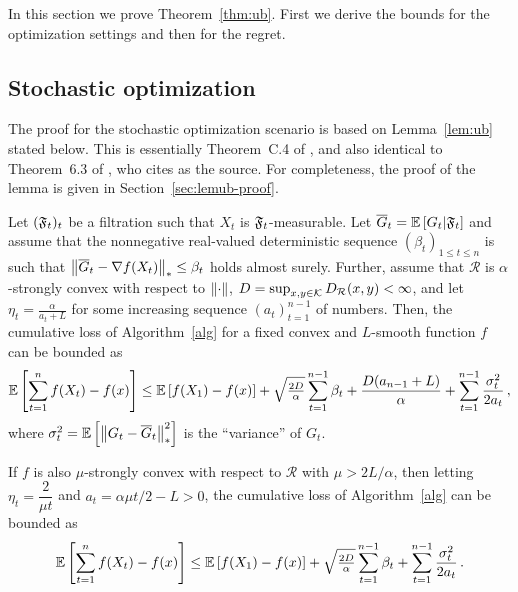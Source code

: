 
In this section we prove Theorem~\ref{thm:ub}. First we derive the bounds for the optimization settings and then for the regret. 

\subsection{Stochastic optimization}

The proof for the stochastic optimization scenario is based on Lemma~\ref{lem:ub} stated below.
This is essentially Theorem~C.4 of \citet{MahdaviPhd:2014}, and also identical to Theorem~6.3 of \citet{Bu:Convex14}, who cites \citet{Dekel:minibatch12} as the source. For completeness, the proof of the lemma is given in Section~\ref{sec:lemub-proof}.
\begin{lemma}
\label{lem:ub}
Let $({\mathfrak{F}}_t)_{t}$ be a filtration such that $X_t$ is ${{\mathfrak{F}}}_t$-measurable.
Let $\overline G_t = \mathbb{E}\left[G_t|{{\mathfrak{F}}}_t\right]$
and assume that the nonnegative real-valued deterministic sequence $(\beta_t)_{1\le t\le n}$ is such that
$\left\|\overline G_t - \nabla {f}(X_t)\right\|_* \le \beta_t$ holds almost surely.
Further, assume that $\mathcal{R}$ is $\alpha$-strongly convex with respect to $\left\|\cdot\right\|$, $D=\sup_{x,y\in \mathcal{K}} D_{\mathcal{R}}(x,y) < \infty$,  and let $\eta_t = \frac{\alpha}{a_t+L}$ for some increasing
sequence $(a_t)_{t=1}^{n-1}$ of numbers. Then, the cumulative loss of Algorithm~\ref{alg} for a fixed convex and $L$-smooth  function $f$ can be bounded as
\begin{align*}
\mathbb{E}\left[ \sum_{t=1}^n {f}(X_t) - {f}(x) \right]
\le 	 \mathbb{E}\left[{f}(X_1)-{f}(x)\right]+
  \sqrt{\tfrac{2D}{\alpha}} \sum_{t=1}^{n-1} \beta_t
 +\frac{D(a_{n-1}+L)}{\alpha} +
	  \sum_{t=1}^{n-1}\frac{\sigma_t^2}{2a_t}\,,
\end{align*}
where $\sigma_t^2 = \mathbb{E}\left[ \left\|G_t-\overline G_t\right\|_*^2\right]$ is the ``variance'' of $G_t$.

If ${{f}}$ is also $\mu$-strongly convex with respect to $\mathcal{R}$ with $\mu > 2L/\alpha$, then letting $\eta_t = \dfrac{2}{\mu t}$ and $a_t = \alpha \mu t/2-L > 0$, the cumulative loss of  Algorithm~\ref{alg} can be bounded as
\begin{align*}
 \mathbb{E}\left[ \sum_{t=1}^n {f}(X_t) - {f}(x) \right]
\le 	 \mathbb{E}\left[{f}(X_1)-{f}(x)\right]+
 \sqrt{\tfrac{2D}{\alpha}} \sum_{t=1}^{n-1} \beta_t
 +\sum_{t=1}^{n-1}\frac{\sigma_t^2}{2a_t}\,.
\end{align*}
\end{lemma}

